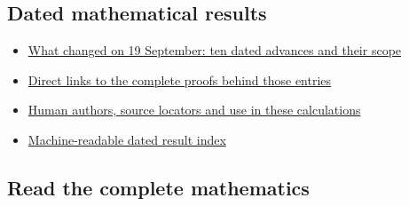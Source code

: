 \documentclass[
]{article}
\providecommand{\tightlist}{%
  \setlength{\itemsep}{0pt}\setlength{\parskip}{0pt}}
\begin{document}
\subsection{Dated mathematical
results}\label{dated-mathematical-results}

\begin{itemize}
\tightlist
\item
  \href{https://github.com/KokunoYumeto/zeta-function-research-reader/blob/main/workbenches/splitzero-tandem/continuations/20260919-observation-responses-first-allocation/NEW_RESULTS_2026-09-19.md}{What
  changed on 19 September: ten dated advances and their scope}
\item
  \href{https://github.com/KokunoYumeto/zeta-function-research-reader/blob/main/workbenches/splitzero-tandem/continuations/20260919-observation-responses-first-allocation/DATED_PROOF_LINKS.md}{Direct
  links to the complete proofs behind those entries}
\item
  \href{https://github.com/KokunoYumeto/zeta-function-research-reader/blob/main/workbenches/splitzero-tandem/continuations/20260919-observation-responses-first-allocation/HUMAN_SOURCE_CONNECTIONS_2026-09-19.md}{Human
  authors, source locators and use in these calculations}
\item
  \href{https://github.com/KokunoYumeto/zeta-function-research-reader/blob/main/workbenches/splitzero-tandem/continuations/20260919-observation-responses-first-allocation/DATED_RESULTS_INDEX.json}{Machine-readable
  dated result index}
\end{itemize}

\subsection{Read the complete
mathematics}\label{read-the-complete-mathematics}
\end{document}
